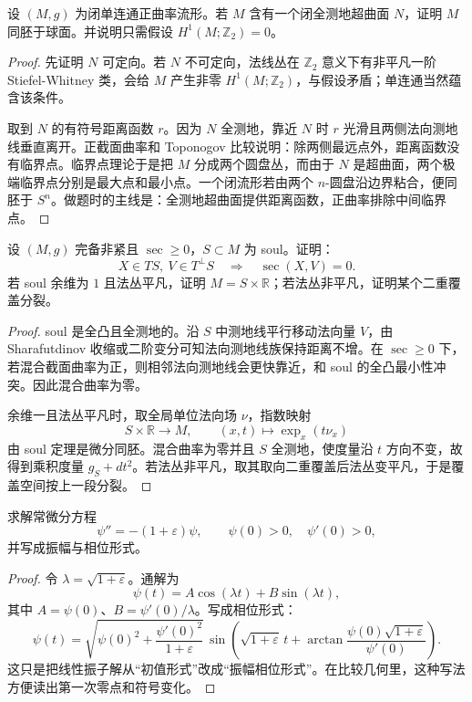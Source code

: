 \documentclass[11pt,a4paper,openany]{ctexbook}
\numberwithin{equation}{chapter}
\begin{document}
\begin{exercise}
设 \((M,g)\) 为闭单连通正曲率流形。若 \(M\) 含有一个闭全测地超曲面 \(N\)，证明 \(M\) 同胚于球面。并说明只需假设 \(H^1(M;\mathbb Z_2)=0\)。
\end{exercise}
\begin{proof}
先证明 \(N\) 可定向。若 \(N\) 不可定向，法线丛在 \(\mathbb Z_2\) 意义下有非平凡一阶 Stiefel-Whitney 类，会给 \(M\) 产生非零 \(H^1(M;\mathbb Z_2)\)，与假设矛盾；单连通当然蕴含该条件。

取到 \(N\) 的有符号距离函数 \(r\)。因为 \(N\) 全测地，靠近 \(N\) 时 \(r\) 光滑且两侧法向测地线垂直离开。正截面曲率和 Toponogov 比较说明：除两侧最远点外，距离函数没有临界点。临界点理论于是把 \(M\) 分成两个圆盘丛，而由于 \(N\) 是超曲面，两个极端临界点分别是最大点和最小点。一个闭流形若由两个 \(n\)-圆盘沿边界粘合，便同胚于 \(S^n\)。做题时的主线是：全测地超曲面提供距离函数，正曲率排除中间临界点。
\end{proof}

\begin{exercise}
设 \((M,g)\) 完备非紧且 \(\sec\ge0\)，\(S\subset M\) 为 soul。证明：
\[
X\in TS,\ V\in T^\perp S\quad\Longrightarrow\quad \sec(X,V)=0.
\]
若 soul 余维为 \(1\) 且法丛平凡，证明 \(M=S\times\mathbb R\)；若法丛非平凡，证明某个二重覆盖分裂。
\end{exercise}
\begin{proof}
soul 是全凸且全测地的。沿 \(S\) 中测地线平行移动法向量 \(V\)，由 Sharafutdinov 收缩或二阶变分可知法向测地线族保持距离不增。在 \(\sec\ge0\) 下，若混合截面曲率为正，则相邻法向测地线会更快靠近，和 soul 的全凸最小性冲突。因此混合曲率为零。

余维一且法丛平凡时，取全局单位法向场 \(\nu\)，指数映射
\[
S\times\mathbb R\to M,\qquad (x,t)\mapsto\exp_x(t\nu_x)
\]
由 soul 定理是微分同胚。混合曲率为零并且 \(S\) 全测地，使度量沿 \(t\) 方向不变，故得到乘积度量 \(g_S+dt^2\)。若法丛非平凡，取其取向二重覆盖后法丛变平凡，于是覆盖空间按上一段分裂。
\end{proof}

\begin{exercise}
求解常微分方程
\[
\psi''=-(1+\varepsilon)\psi,\qquad \psi(0)>0,\quad \psi'(0)>0,
\]
并写成振幅与相位形式。
\end{exercise}
\begin{proof}
令 \(\lambda=\sqrt{1+\varepsilon}\)。通解为
\[
\psi(t)=A\cos(\lambda t)+B\sin(\lambda t),
\]
其中 \(A=\psi(0)\)、\(B=\psi'(0)/\lambda\)。写成相位形式：
\[
\psi(t)=\sqrt{\psi(0)^2+\frac{\psi'(0)^2}{1+\varepsilon}}\,
\sin\left(\sqrt{1+\varepsilon}\,t+\arctan\frac{\psi(0)\sqrt{1+\varepsilon}}{\psi'(0)}\right).
\]
这只是把线性振子解从“初值形式”改成“振幅相位形式”。在比较几何里，这种写法方便读出第一次零点和符号变化。
\end{proof}
\end{document}
